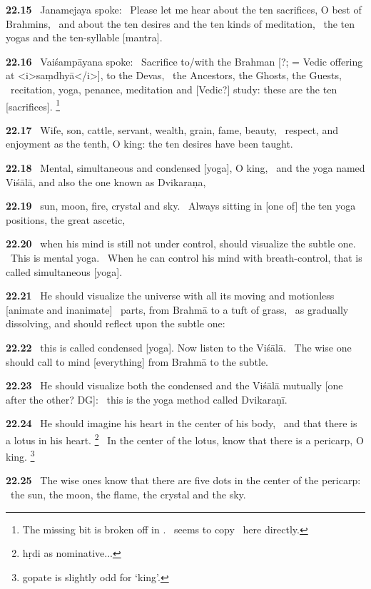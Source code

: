 \documentclass{article}
\begin{document}
\textbf{22.15}%
\ Janamejaya spoke:%
\ Please let me hear about the ten sacrifices, O best of Brahmins,%
\ and about the ten desires and the ten kinds of meditation,%
\              the ten yogas and the ten-syllable [mantra].%


\textbf{22.16}%
\ Vaiśampāyana spoke:%
\ Sacrifice to/with the Brahman [?; = Vedic offering at <i>saṃdhyā</i>], to the Devas,%
\                          the Ancestors, the Ghosts, the Guests,%
\ recitation, yoga, penance, meditation and [Vedic?] study: these are the ten [sacrifices].%
\footnote{The missing bit is broken off in \msNa. \msL\ seems to copy \msNa\ here directly. }%


\textbf{22.17}%
\ Wife, son, cattle, servant, wealth, grain, fame, beauty,%
\ respect, and enjoyment as the tenth, O king: the ten desires have been taught.%


\textbf{22.18}%
\ Mental, simultaneous and condensed [yoga], O king,%
\ and the yoga named Viśālā, and also the one known as Dvikaraṇa,%


\textbf{22.19}%
\ sun, moon, fire, crystal and sky.%
\ Always sitting in [one of] the ten yoga positions, the great ascetic,%


\textbf{22.20}%
\ when his mind is still not under control, should visualize the subtle one.%
\                                  This is mental yoga.%
\ When he can control his mind with breath-control, that is called simultaneous [yoga].%


\textbf{22.21}%
\ He should visualize the universe with all its moving and motionless [animate and inanimate]%
\                         parts, from Brahmā to a tuft of grass,%
\ as gradually dissolving, and should reflect upon the subtle one:%


\textbf{22.22}%
\ this is called condensed [yoga]. Now listen to the Viśālā.%
\ The wise one should call to mind [everything] from Brahmā to the subtle.%


\textbf{22.23}%
\ He should visualize both the condensed and the Viśālā mutually [one after the other? DG]:%
\ this is the yoga method called Dvikaraṇī.%


\textbf{22.24}%
\ He should imagine his heart in the center of his body,%
\                         and that there is a lotus in his heart.%
\footnote{hṛdi as nominative... }%
\ In the center of the lotus, know that there is a pericarp, O king.%
\footnote{gopate is slightly odd for `king'. }%


\textbf{22.25}%
\ The wise ones know that there are five dots in the center of the pericarp:%
\ the sun, the moon, the flame, the crystal and the sky.%
\end{document}
